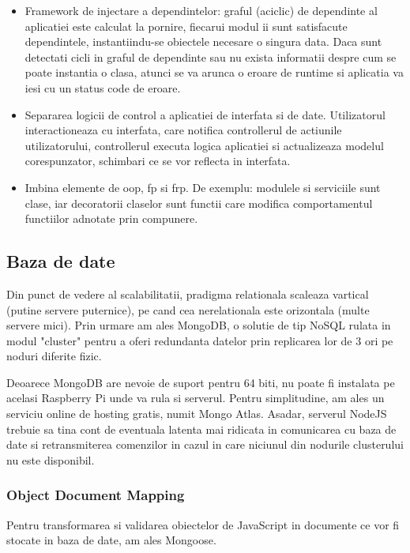 \begin{itemize}
  \item Framework de injectare a dependintelor: graful (aciclic) de dependinte al aplicatiei este calculat la pornire, fiecarui modul ii sunt satisfacute dependintele, instantiindu-se obiectele necesare o singura data. Daca sunt detectati cicli in graful de dependinte sau nu exista informatii despre cum se poate instantia o clasa, atunci se va arunca o eroare de runtime si aplicatia va iesi cu un status code de eroare. 
  \item Separarea logicii de control a aplicatiei de interfata si de date. Utilizatorul interactioneaza cu interfata, care notifica controllerul de actiunile utilizatorului, controllerul executa logica aplicatiei si actualizeaza modelul corespunzator, schimbari ce se vor reflecta in interfata.
  \item Imbina elemente de \acrfull{oop}, \acrfull{fp} si \acrfull{frp}. De exemplu: modulele si serviciile sunt clase, iar decoratorii claselor sunt functii care modifica comportamentul functiilor adnotate prin compunere.

\end{itemize}

\subsection {Baza de date}

Din punct de vedere al scalabilitatii, pradigma relationala scaleaza vartical (putine servere puternice), pe cand cea nerelationala este orizontala (multe servere mici). Prin urmare am ales MongoDB, o solutie de tip NoSQL rulata in modul "cluster" pentru a oferi redundanta datelor prin replicarea lor de 3 ori pe noduri diferite fizic.

Deoarece MongoDB are nevoie de suport pentru 64 biti, nu poate fi instalata pe acelasi Raspberry Pi unde va rula si serverul. Pentru simplitudine, am ales un serviciu online de hosting gratis, numit Mongo Atlas. Asadar, serverul NodeJS trebuie sa tina cont de eventuala latenta mai ridicata in comunicarea cu baza de date si retransmiterea comenzilor in cazul in care niciunul din nodurile clusterului nu este disponibil.

\subsubsection {Object Document Mapping}

Pentru transformarea si validarea obiectelor de JavaScript in documente ce vor fi stocate in baza de date, am ales Mongoose.

